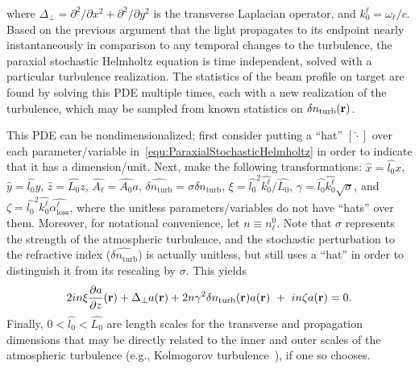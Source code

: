 \documentclass[9pt,twocolumn,twoside]{osajnl}
\newcommand\pder[2]{\frac{\partial #1}{\partial #2}}
\newcommand{\la}[1]{\label{#1}}
\newcommand{\p}{\partial}
\begin{document}
where $\Delta_{\perp} = \p^{2} / \p x^{2} + \p^{2} / \p y^{2}$ is the 
transverse Laplacian operator, and $k_{0}^{\ell} = \omega_{\ell} / c$.  
Based on the previous argument that the light propagates to its endpoint 
nearly instantaneously in comparison to any temporal changes to the turbulence, 
the paraxial stochastic Helmholtz equation is time independent, solved with a 
particular turbulence realization.  The statistics of the beam profile on target 
are found by solving this PDE multiple times, each with a new realization of the 
turbulence, which may be sampled from known statistics on $\delta n_{\text{turb}}({\bf r})$.

This PDE can be nondimensionalized; first consider putting a ``hat'' $[\hat{\cdot}]$ 
over each parameter/variable in~\eqref{equ:ParaxialStochasticHelmholtz} in order to 
indicate that it has a dimension/unit.  
Next, make the following transformations: 
$\hat{x} = \widehat{l_{0}} x$, 
$\hat{y} = \widehat{l_{0}} y$, $\hat{z} = \widehat{L_{0}} z$, 
$\widehat{A_{\ell}} = \widehat{A_{0}} a$, 
$\widehat{\delta n_{\text{turb}}} = \sigma \delta n_{\text{turb}}$, 
$\xi = \widehat{l_{0}}^{2} \widehat{k_{0}^{\ell}} / \widehat{L_{0}}$, 
$\gamma = \widehat{l_{0}} \widehat{k_{0}^{\ell}} \sqrt{\sigma}$, 
and $\zeta = \widehat{l_{0}}^{2} \widehat{k_{0}^{\ell}} \widehat{\alpha_{\text{loss}}^{\ell}}$, 
where the unitless parameters/variables do not have ``hats'' over them.  
Moreover, for notational convenience, let $n \equiv n_{\ell}^{0}$.  
Note that $\sigma$ represents the strength of the atmospheric turbulence, 
and the stochastic perturbation to the refractive index ($\widehat{\delta n_{\text{turb}}}$) 
is actually unitless, but still uses a ``hat'' in order to distinguish it 
from its rescaling by $\sigma$.  
This yields
\begin{equation}\la{equ:NDHelmholtz}
    2i n \xi \pder{a}{z}({\bf r}) + \Delta_{\perp}a({\bf r}) + 
    2 n \gamma^{2} \delta n_{\text{turb}}({\bf r}) a({\bf r}) \ + \ i n \zeta a({\bf r})  = 0 .
\end{equation}
Finally, $0 < \widehat{l_{0}} < \widehat{L_{0}}$ are length scales for the transverse and propagation dimensions
that may be directly related to the inner and outer scales of the atmospheric turbulence (e.g., Kolmogorov 
turbulence~\cite{kolmogorov1941local, frisch1995turbulence}), if one so chooses.  
\end{document}
